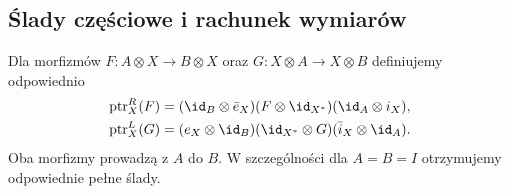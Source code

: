 \subsection{Ślady częściowe i rachunek wymiarów}

\begin{definicja}\label{cat:def:tf-partial-traces}
Dla morfizmów $F:A\otimes X\to B\otimes X$ oraz $G:X\otimes A\to X\otimes B$ definiujemy odpowiednio
\[
\begin{aligned}
 \operatorname{ptr}^{R}_{X}(F)
 &=(\id_B\otimes\bar e_X)(F\otimes\id_{X^*})(\id_A\otimes i_X),\\
 \operatorname{ptr}^{L}_{X}(G)
 &=(e_X\otimes\id_B)(\id_{X^*}\otimes G)(\bar i_X\otimes\id_A).
\end{aligned}
\]
Oba morfizmy prowadzą z $A$ do $B$. W szczególności dla $A=B=I$ otrzymujemy odpowiednie pełne ślady.
\end{definicja}

